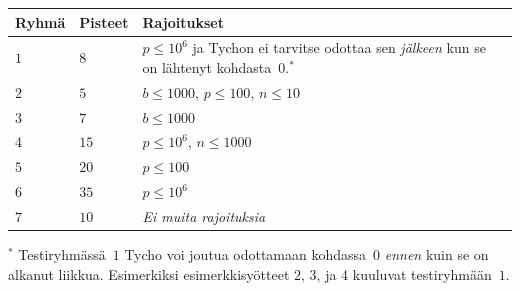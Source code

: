 \medskip
\begin{tabular}{lll}
Ryhmä & Pisteet & Rajoitukset \\\hline
  $1$ & $8$  & $p\leq 10^6$ 
  ja Tychon ei tarvitse odottaa sen \emph{jälkeen} kun se on lähtenyt kohdasta~$0$.$^*$ \\ %
  $2$ & $5$  & $b\leq 1000$, $p\leq 100$, $n\leq 10$ \\
  $3$ & $7$  & $b\leq 1000$ \\
  $4$ & $15$ & $p\leq 10^6$, $n\leq 1000$\\
  $5$ & $20$ & $p\leq 100$\\
  $6$ & $35$ & $p\leq 10^6$\\
  $7$ & $10$ & \emph{Ei muita rajoituksia}
\end{tabular}

\medskip
\noindent $^*$ Testiryhmässä~$1$ Tycho 
voi joutua odottamaan kohdassa~$0$ \emph{ennen} kuin se on alkanut liikkua.
Esimerkiksi e\-si\-merk\-ki\-syöt\-teet $2$, $3$, ja $4$ kuuluvat testiryhmään~$1$.
